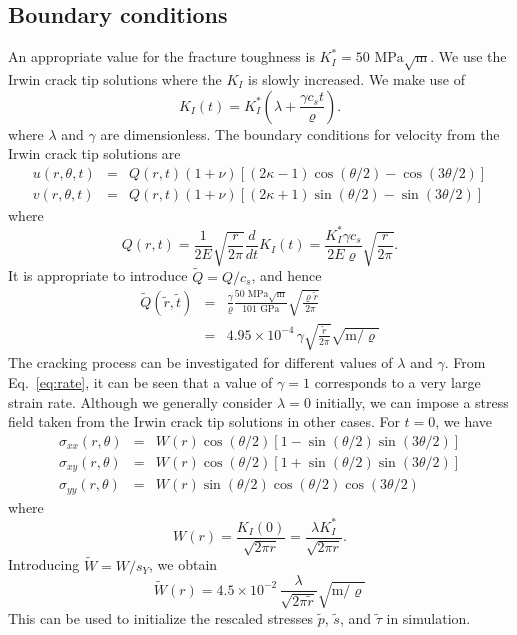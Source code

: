 \documentclass[12pt]{article}
\newcommand{\GPa}{\textrm{~GPa}}
\newcommand{\MPa}{\textrm{~MPa}}
\newcommand{\tT}{\tilde{t}}
\newcommand{\rT}{\tilde{r}}
\newcommand{\QT}{\tilde{Q}}
\newcommand{\sY}{s_Y}
\newcommand{\Kfac}{K_I^*}
\begin{document}
\subsection*{Boundary conditions}
An appropriate value for the fracture toughness is $\Kfac = 50 \MPa
\sqrt{\textrm{m}}$. We use the Irwin crack tip solutions where the $K_I$ is
slowly increased. We make use of
\begin{equation}
  \label{eq:rate}
  K_I(t) = \Kfac \left(\lambda+\frac{\gamma c_s t}{\varrho}\right).
\end{equation}
where $\lambda$ and $\gamma$ are dimensionless. The boundary conditions for
velocity from the Irwin crack tip solutions are
\begin{eqnarray*}
u(r,\theta,t) &=& Q(r,t) (1+\nu) [(2\kappa -1)\cos(\theta/2) - \cos(3\theta/2)] \\
v(r,\theta,t) &=& Q(r,t) (1+\nu) [(2\kappa +1)\sin(\theta/2) - \sin(3\theta/2)]
\end{eqnarray*}
where
\[
Q(r,t) = \frac{1}{2E} \sqrt{\frac{r}{2\pi}} \frac{d}{dt} K_I(t)
= \frac{\Kfac\gamma c_s}{2E\varrho} \sqrt{\frac{r}{2\pi}}.
\]
It is appropriate to introduce $\QT=Q/c_s$, and hence
\begin{eqnarray*}
  \QT(\rT,\tT) &=& \frac{\gamma}{\varrho} \frac{50 \MPa \sqrt{\textrm{m}}}{101 \GPa} \sqrt{\frac{\varrho\rT}{2\pi}} \\
  &=& 4.95 \times 10^{-4} \, \gamma \sqrt{\frac{\rT}{2\pi}} \sqrt{\textrm{m}/\varrho}
\end{eqnarray*}
The cracking process can be investigated for different values of $\lambda$ and
$\gamma$. From Eq.~\ref{eq:rate}, it can be seen that a value of
$\gamma=1$ corresponds to a very large strain rate. Although we generally
consider $\lambda=0$ initially, we can impose a stress field taken from the
Irwin crack tip solutions in other cases. For $t=0$, we have
\begin{eqnarray*}
  \sigma_{xx}(r,\theta) &=& W(r) \cos(\theta/2)[1-\sin(\theta/2)\sin(3\theta/2)] \\
  \sigma_{xy}(r,\theta) &=& W(r) \cos(\theta/2)[1+\sin(\theta/2)\sin(3\theta/2)] \\
  \sigma_{yy}(r,\theta) &=& W(r) \sin(\theta/2) \cos(\theta/2) \cos(3\theta/2)
\end{eqnarray*}
where
\[
W(r) = \frac{K_I(0)}{\sqrt{2\pi r}} = \frac{\lambda\Kfac}{\sqrt{2\pi r}}.
\]
Introducing $\tilde{W}=W/\sY$, we obtain
\[
\tilde{W}(r) = 4.5\times 10^{-2} \, \frac{\lambda}{\sqrt{2\pi \tilde{r}}} \sqrt{ \textrm{m}/\varrho}
\]
This can be used to initialize the rescaled stresses $\tilde{p}$, $\tilde{s}$, and
$\tilde{\tau}$ in simulation.
\end{document}

